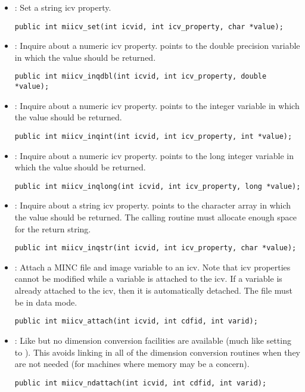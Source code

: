 \begin{itemize}
\item {} : Set a string icv property.
\begin{verbatim}
public int miicv_set(int icvid, int icv_property, char *value);
\end{verbatim}

\item {} : Inquire about a numeric icv property.
 points to the double precision variable in which the
value should be returned. 
\begin{verbatim}
public int miicv_inqdbl(int icvid, int icv_property, double *value);
\end{verbatim}

\item {} : Inquire about a numeric icv property.
 points to the integer variable in which the
value should be returned. 
\begin{verbatim}
public int miicv_inqint(int icvid, int icv_property, int *value);
\end{verbatim}

\item {} : Inquire about a numeric icv property.
 points to the long integer variable in which the
value should be returned. 
\begin{verbatim}
public int miicv_inqlong(int icvid, int icv_property, long *value);
\end{verbatim}

\item {} : Inquire about a string icv property. 
points to the character array in which the value should be returned. The
calling routine must allocate enough space for the return string.
\begin{verbatim}
public int miicv_inqstr(int icvid, int icv_property, char *value);
\end{verbatim}

\item {} : Attach a MINC file and image variable to
an icv. Note that icv properties cannot be modified while a variable
is attached to the icv. If a variable is already attached to the icv,
then it is automatically detached. The file  must be in
data mode.
\begin{verbatim}
public int miicv_attach(int icvid, int cdfid, int varid);
\end{verbatim}

\item {} : Like  but no
dimension conversion facilities are available (much like setting
 to ). This avoids linking in
all of the dimension conversion routines when they are not needed (for
machines where memory may be a concern).
\begin{verbatim}
public int miicv_ndattach(int icvid, int cdfid, int varid);
\end{verbatim}


\end{itemize}
